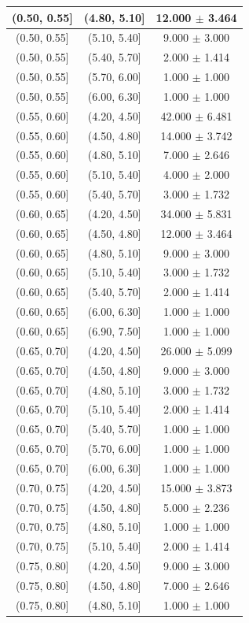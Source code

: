 \begin{longtable}{|c|c|c|}
\hline
(0.50, 0.55] & (4.80, 5.10] & 12.000 $\pm$ 3.464 \\ 
\hline
(0.50, 0.55] & (5.10, 5.40] & 9.000 $\pm$ 3.000 \\ 
\hline
(0.50, 0.55] & (5.40, 5.70] & 2.000 $\pm$ 1.414 \\ 
\hline
(0.50, 0.55] & (5.70, 6.00] & 1.000 $\pm$ 1.000 \\ 
\hline
(0.50, 0.55] & (6.00, 6.30] & 1.000 $\pm$ 1.000 \\ 
\hline
(0.55, 0.60] & (4.20, 4.50] & 42.000 $\pm$ 6.481 \\ 
\hline
(0.55, 0.60] & (4.50, 4.80] & 14.000 $\pm$ 3.742 \\ 
\hline
(0.55, 0.60] & (4.80, 5.10] & 7.000 $\pm$ 2.646 \\ 
\hline
(0.55, 0.60] & (5.10, 5.40] & 4.000 $\pm$ 2.000 \\ 
\hline
(0.55, 0.60] & (5.40, 5.70] & 3.000 $\pm$ 1.732 \\ 
\hline
(0.60, 0.65] & (4.20, 4.50] & 34.000 $\pm$ 5.831 \\ 
\hline
(0.60, 0.65] & (4.50, 4.80] & 12.000 $\pm$ 3.464 \\ 
\hline
(0.60, 0.65] & (4.80, 5.10] & 9.000 $\pm$ 3.000 \\ 
\hline
(0.60, 0.65] & (5.10, 5.40] & 3.000 $\pm$ 1.732 \\ 
\hline
(0.60, 0.65] & (5.40, 5.70] & 2.000 $\pm$ 1.414 \\ 
\hline
(0.60, 0.65] & (6.00, 6.30] & 1.000 $\pm$ 1.000 \\ 
\hline
(0.60, 0.65] & (6.90, 7.50] & 1.000 $\pm$ 1.000 \\ 
\hline
(0.65, 0.70] & (4.20, 4.50] & 26.000 $\pm$ 5.099 \\ 
\hline
(0.65, 0.70] & (4.50, 4.80] & 9.000 $\pm$ 3.000 \\ 
\hline
(0.65, 0.70] & (4.80, 5.10] & 3.000 $\pm$ 1.732 \\ 
\hline
(0.65, 0.70] & (5.10, 5.40] & 2.000 $\pm$ 1.414 \\ 
\hline
(0.65, 0.70] & (5.40, 5.70] & 1.000 $\pm$ 1.000 \\ 
\hline
(0.65, 0.70] & (5.70, 6.00] & 1.000 $\pm$ 1.000 \\ 
\hline
(0.65, 0.70] & (6.00, 6.30] & 1.000 $\pm$ 1.000 \\ 
\hline
(0.70, 0.75] & (4.20, 4.50] & 15.000 $\pm$ 3.873 \\ 
\hline
(0.70, 0.75] & (4.50, 4.80] & 5.000 $\pm$ 2.236 \\ 
\hline
(0.70, 0.75] & (4.80, 5.10] & 1.000 $\pm$ 1.000 \\ 
\hline
(0.70, 0.75] & (5.10, 5.40] & 2.000 $\pm$ 1.414 \\ 
\hline
(0.75, 0.80] & (4.20, 4.50] & 9.000 $\pm$ 3.000 \\ 
\hline
(0.75, 0.80] & (4.50, 4.80] & 7.000 $\pm$ 2.646 \\ 
\hline
(0.75, 0.80] & (4.80, 5.10] & 1.000 $\pm$ 1.000 \\ 
\hline
\end{longtable}
